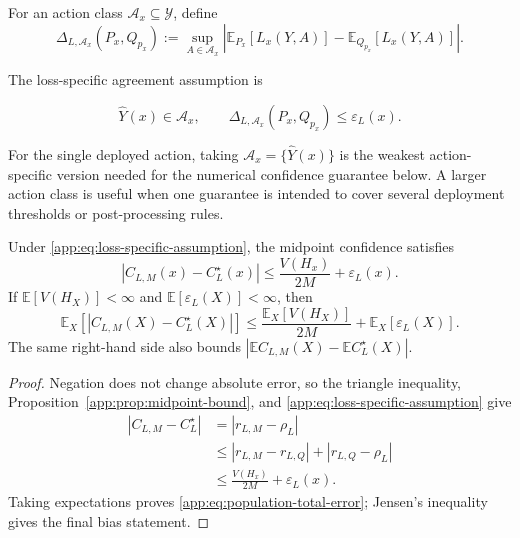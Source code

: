 \begin{definition}
\label{app:def:loss-ipm}
For an action class $\mathcal{A}_x\subseteq\mathcal{Y}$, define
\begin{equation}
  \Delta_{L,\mathcal{A}_x}(P_x,Q_{p_x})
  :=\sup_{A\in\mathcal{A}_x}
    \left|
      \mathbb{E}_{P_x}[L_x(Y,A)]
      -\mathbb{E}_{Q_{p_x}}[L_x(Y,A)]
    \right|.
  \label{app:eq:loss-ipm}
\end{equation}
\end{definition}

The loss-specific agreement assumption is

\begin{equation}
  \widehat Y(x)\in\mathcal{A}_x,
  \qquad
  \Delta_{L,\mathcal{A}_x}(P_x,Q_{p_x})
  \leq\varepsilon_L(x).
  \label{app:eq:loss-specific-assumption}
\end{equation}

For the single deployed action, taking
$\mathcal{A}_x=\{\widehat Y(x)\}$ is the weakest action-specific version
needed for the numerical confidence guarantee below.  A larger action
class is useful when one guarantee is intended to cover several
deployment thresholds or post-processing rules.

\begin{proposition}
\label{app:prop:total-error}
Under \eqref{app:eq:loss-specific-assumption}, the midpoint confidence
satisfies
\begin{equation}
  \left|C_{L,M}(x)-C_L^\star(x)\right|
  \leq
  \frac{V(H_x)}{2M}+\varepsilon_L(x).
  \label{app:eq:pointwise-total-error}
\end{equation}
If $\mathbb{E}[V(H_X)]<\infty$ and
$\mathbb{E}[\varepsilon_L(X)]<\infty$, then
\begin{equation}
  \mathbb{E}_X\!\left[
    |C_{L,M}(X)-C_L^\star(X)|\right]
  \leq
  \frac{\mathbb{E}_X[V(H_X)]}{2M}
  +\mathbb{E}_X[\varepsilon_L(X)].
  \label{app:eq:population-total-error}
\end{equation}
The same right-hand side also bounds
$|\mathbb{E}C_{L,M}(X)-\mathbb{E}C_L^\star(X)|$.
\end{proposition}

\begin{proof}
Negation does not change absolute error, so the triangle inequality,
Proposition~\ref{app:prop:midpoint-bound}, and
\eqref{app:eq:loss-specific-assumption} give
\begin{align}
  |C_{L,M}-C_L^\star|
  &=|r_{L,M}-\rho_L|\\
  &\leq |r_{L,M}-r_{L,Q}|
       +|r_{L,Q}-\rho_L|\\
  &\leq \frac{V(H_x)}{2M}+\varepsilon_L(x).
\end{align}
Taking expectations proves
\eqref{app:eq:population-total-error}; Jensen's inequality gives the
final bias statement.
\end{proof}


